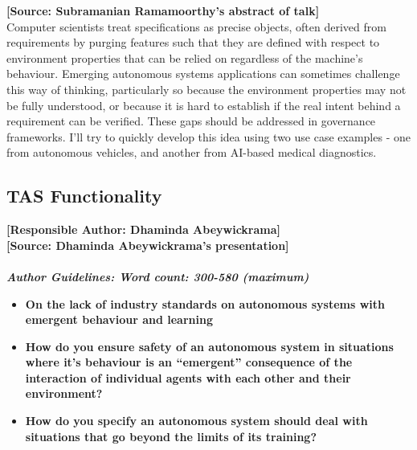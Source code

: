 \documentclass[sigconf]{acmart}
\begin{document}
\noindent\textbf{[Source: Subramanian Ramamoorthy's abstract of talk]}\\
Computer scientists treat specifications as precise objects, often derived from requirements by purging features such that they are defined with respect to environment properties that can be relied on regardless of the machine's behaviour. Emerging autonomous systems applications can sometimes challenge this way of thinking, particularly so because the environment properties may not be fully understood, or because it is hard to establish if the real intent behind a requirement can be verified. These gaps should be addressed in governance frameworks. I'll try to quickly develop this idea using two use case examples - one from autonomous vehicles, and another from AI-based medical diagnostics.

\subsection{TAS Functionality}
\noindent\textbf{[Responsible Author:  Dhaminda Abeywickrama]}\\
\noindent\textbf{[Source: Dhaminda Abeywickrama's presentation]}\\\\
\noindent\textbf{\textit{Author Guidelines: Word count: 300-580 (maximum)}}\\
\begin{itemize}
	\item \textbf{On the lack of industry standards on autonomous systems with emergent behaviour and learning}
	\item \textbf{How do you ensure safety of an autonomous system in situations where it’s behaviour is an “emergent” consequence of the interaction of individual agents with each other and their environment?}
	\item \textbf{How do you specify an autonomous system should deal with situations that go beyond the limits of its training?}
\end{itemize}

\end{document}
